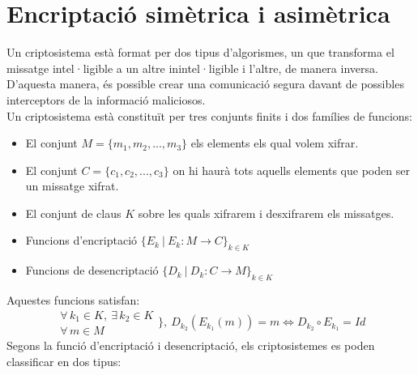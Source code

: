 \documentclass{article}
\begin{document}
\section{Encriptació simètrica i asimètrica}
Un criptosistema està format per dos tipus d'algorismes, un que transforma el
missatge intel·ligible a un altre inintel·ligible i l'altre, de manera inversa. D'aquesta manera, és possible crear una comunicació segura davant de possibles interceptors de la informació maliciosos.
\\
Un criptosistema està constituït per tres conjunts finits i dos famílies de funcions:
\begin{itemize}
	\item El conjunt $M = \{m_1, m_2, ..., m_3\}$ els elements els qual volem xifrar.
	\item El conjunt $C = \{c_1, c_2, ..., c_3\}$ on hi haurà tots aquells elements que poden ser un missatge xifrat.
	\item El conjunt de claus $K$ sobre les quals xifrarem i desxifrarem els missatges.
	\item Funcions d'encriptació $\{E_k \ | \ E_k : M \rightarrow C \}_{k \in K} $
	\item Funcions de desencriptació $\{D_k \ | \ D_k : C \rightarrow M \}_{k \in K}$
\end{itemize}
Aquestes funcions satisfan:
\[ \begin{array}{l}
	\forall \, k_1 \in K, \ \exists \, k_2 \in K\\
	\forall \, m \in M
\end{array} \Bigg\}, \ D_{k_2}(E_{k_1}(m)) = m \Longleftrightarrow D_{k_2} \circ E_{k_1} =  Id\]
Segons la funció d'encriptació i desencriptació, els criptosistemes es poden classificar en dos tipus:
\end{document}
